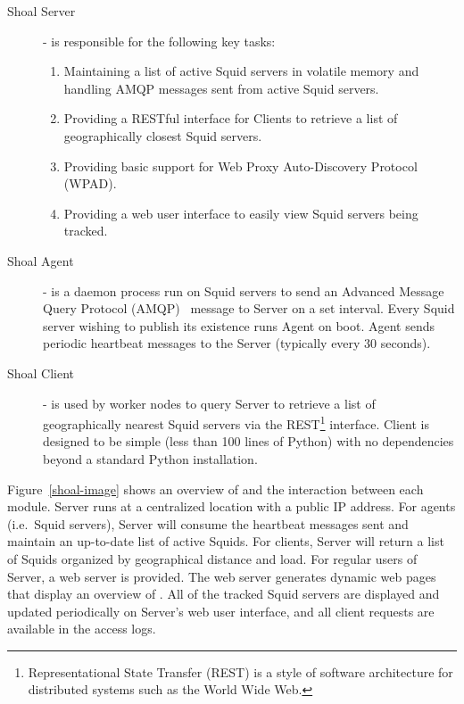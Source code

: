 \documentclass[a4paper]{jpconf}
\begin{document}
\begin{description}

\item[Shoal Server]- is responsible for the following key tasks:
\begin{enumerate}
\item Maintaining a list of active Squid servers in volatile memory and handling AMQP 
messages sent from active Squid servers.
\item Providing a RESTful interface for \shoal Clients to retrieve a list of geographically 
closest Squid servers.
\item Providing basic support for Web Proxy Auto-Discovery Protocol (WPAD).
\item Providing a web user interface to easily view Squid servers being tracked.
\end{enumerate}

\item[Shoal Agent]- is a daemon process run on Squid servers to send an Advanced 
Message Query Protocol (AMQP)~\cite{ref:amqp} message to \shoal Server on a set interval. 
Every Squid server wishing to publish its existence runs \shoal Agent on boot. 
\shoal Agent sends periodic heartbeat messages to the \shoal Server (typically every 30 seconds).

\item[Shoal Client]- is used by worker nodes to query \shoal Server to retrieve
a list  of geographically nearest Squid servers via the 
REST\footnote{Representational State Transfer (REST) is a style of software architecture 
for distributed systems such as the World Wide Web.} interface.
\shoal Client is designed to be simple (less than 100 lines of Python) with no dependencies 
beyond a standard Python installation.

\end{description}

Figure~\ref{shoal-image} shows an overview of \shoal and the interaction between each module. 
\shoal Server runs at a centralized location with a public IP address. 
For agents (i.e.\ Squid servers), \shoal Server will consume the heartbeat messages sent 
and maintain an up-to-date list of active Squids. 
For clients, \shoal Server will return a list of Squids organized by geographical distance and load. 
For regular users of \shoal Server, a web server is provided. 
The web server generates dynamic web pages that display an overview of \shoal. 
All of the tracked Squid servers are displayed and updated periodically on \shoal Server's 
web user interface, and all client requests are available in the access logs.
\end{document}
